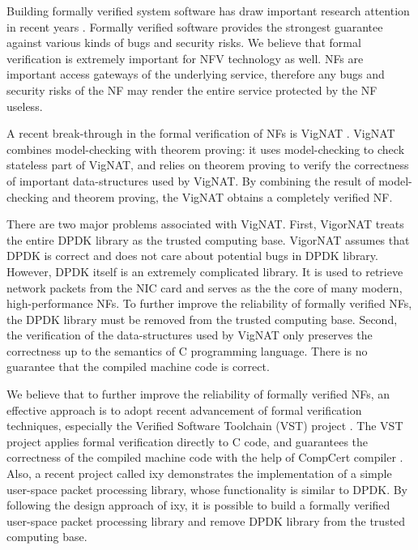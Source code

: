 Building formally verified system software has draw important research attention in recent years \cite{199344, nelson2017hyperkernel, zaostrovnykh2017formally}. Formally verified software provides the strongest guarantee against various kinds of bugs and security risks. We believe that formal verification is extremely important for NFV technology as well. NFs are important access gateways of the underlying service, therefore any bugs and security risks of the NF may render the entire service protected by the NF useless.

A recent break-through in the formal verification of NFs is VigNAT \cite{zaostrovnykh2017formally}. VigNAT combines model-checking with theorem proving: it uses model-checking to check stateless part of VigNAT, and relies on theorem proving to verify the correctness of important data-structures used by VigNAT. By combining the result of model-checking and theorem proving, the VigNAT obtains a completely verified NF.

There are two major problems associated with VigNAT. First, VigorNAT treats the entire DPDK library \cite{dpdk} as the trusted computing base. VigorNAT assumes that DPDK is correct and does not care about potential bugs in DPDK library. However, DPDK itself is an extremely complicated library. It is used to retrieve network packets from the NIC card and serves as the the core of many modern, high-performance NFs. To further improve the reliability of formally verified NFs, the DPDK library must be removed from the trusted computing base. Second, the verification of the data-structures used by VigNAT only preserves the correctness up to the semantics of C programming language. There is no guarantee that the compiled machine code is correct.

We believe that to further improve the reliability of formally verified NFs, an effective approach is to adopt recent advancement of formal verification techniques, especially the Verified Software Toolchain (VST) project \cite{vst}. The VST project applies formal verification directly to C code, and guarantees the correctness of the compiled machine code with the help of CompCert compiler \cite{leroy2006formal}. Also, a recent project called ixy \cite{ixy} demonstrates the implementation of a simple user-space packet processing library, whose functionality is similar to DPDK. By following the design approach of ixy, it is possible to build a formally verified user-space packet processing library and remove DPDK library from the trusted computing base.

